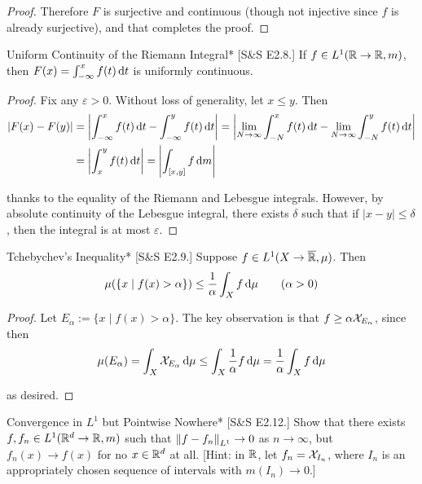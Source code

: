 \begin{proof}
    Therefore \(F\) is surjective and continuous (though not injective since \(f\) is already surjective), and that completes the proof. 
\end{proof}

\begin{problem}{Uniform Continuity of the Riemann Integral}*
    [S\&S E2.8.] If \(f \in L^1(\mathbb{R} \to \mathbb{R}, m)\), then \(F(x) = \int_{-\infty}^x f(t) \, \mathrm{d}t\) is uniformly continuous.
\end{problem}

\begin{proof}
    Fix any \(\varepsilon > 0\). Without loss of generality, let \(x \leq y\). Then
    \begin{align*}
        |F(x) - F(y)| 
        &= \left| \int_{-\infty}^x f(t) \, \mathrm{d}t - \int_{-\infty}^y f(t) \, \mathrm{d}t \right| 
        = \left| \lim_{N \to \infty} \int_{-N}^x f(t) \,\mathrm{d}t - \lim_{N \to \infty} \int_{-N}^y f(t) \, \mathrm{d}t \right|  \\
        &= \left| \int_x^y f(t) \, \mathrm{d}t \right| 
        = \left| \int_{[x, y]} f \, \mathrm{d} m \right| 
    \end{align*}

    thanks to the equality of the Riemann and Lebesgue integrals. However, by absolute continuity of the Lebesgue integral, there exists \(\delta\) such that if \(|x - y| \leq \delta\), then the integral is at most \(\varepsilon\).
\end{proof}

\begin{problem}{Tchebychev's Inequality}*
    [S\&S E2.9.] Suppose \(f \in L^1(X \to \overline{\mathbb{R}}, \mu)\). Then
    \[
    \mu(\{x \mid f(x) > \alpha\}) \leq \frac{1}{\alpha} \int_{X} f \, \mathrm{d}\mu \qquad (\alpha > 0)
    \]
\end{problem}

\begin{proof}
    Let \(E_{\alpha} := \{x \mid f(x) > \alpha\}\). The key observation is that \(f \geq \alpha \mathcal{X}_{E_\alpha}\), since then
    \[
        \mu(E_\alpha) = \int_X \mathcal{X}_{E_\alpha} \, \mathrm{d}\mu 
        \leq \int_X \frac{1}{\alpha} f \, \mathrm{d} \mu 
        = \frac{1}{\alpha} \int_X f \, \mathrm{d} \mu
    \]

    as desired. 
\end{proof}

\begin{problem}{Convergence in \(L^1\) but Pointwise Nowhere}*
    [S\&S E2.12.] Show that there exists \(f, f_n \in L^1(\mathbb{R}^d \to \mathbb{R}, m)\) such that \(\norm{f - f_n}_{L^1} \to 0\) as \(n \to \infty\), but \(f_n(x) \to f(x)\) for no \(x \in \mathbb{R}^d\) at all. [Hint: in \(\mathbb{R}\), let \(f_n = \mathcal{X}_{I_n}\), where \(I_n\) is an appropriately chosen sequence of intervals with \(m(I_n) \to 0\).]
\end{problem}

